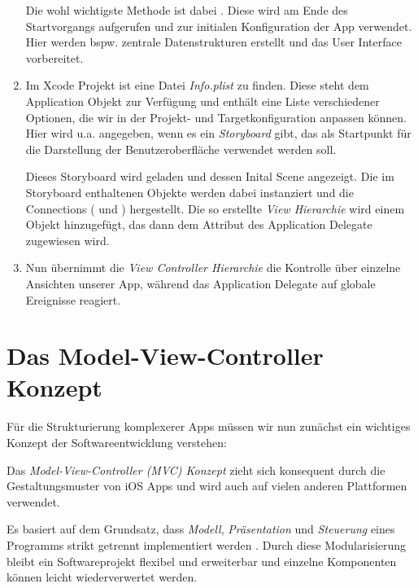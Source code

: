 \documentclass[parskip=half, final]{scrreprt}
\begin{document}
\begin{enumerate}
Die wohl wichtigste Methode ist dabei . Diese wird am Ende des Startvorgangs aufgerufen und zur initialen Konfiguration der App verwendet. Hier werden bspw. zentrale Datenstrukturen erstellt und das User Interface vorbereitet.

\item Im Xcode Projekt ist eine Datei \emph{Info.plist} zu finden. Diese steht dem Application Objekt zur Verfügung und enthält eine Liste verschiedener Optionen, die wir in der Projekt- und Targetkonfiguration anpassen können. Hier wird u.a. angegeben, wenn es ein \emph{Storyboard} gibt, das als Startpunkt für die Darstellung der Benutzeroberfläche verwendet werden soll.

Dieses Storyboard wird geladen und dessen Inital Scene angezeigt. Die im Storyboard enthaltenen Objekte werden dabei instanziert und die Connections ( und ) hergestellt. Die so erstellte \emph{View Hierarchie}  wird einem  Objekt hinzugefügt, das dann dem Attribut  des Application Delegate zugewiesen wird.

\item Nun übernimmt die \emph{View Controller Hierarchie}  die Kontrolle über einzelne Ansichten unserer App, während das Application Delegate auf globale Ereignisse reagiert.

\end{enumerate}

\clearpage


\section{Das Model-View-Controller Konzept}\label{sec:mvc}

Für die Strukturierung komplexerer Apps müssen wir nun zunächst ein wichtiges Konzept der Softwareentwicklung verstehen:

Das \emph{Model-View-Controller (MVC) Konzept} zieht sich konsequent durch die Gestaltungsmuster von iOS Apps und wird auch auf vielen anderen Plattformen verwendet.

Es basiert auf dem Grundsatz, dass \emph{Modell}, \emph{Präsentation} und \emph{Steuerung} eines Programms strikt getrennt implementiert werden . Durch diese Modularisierung bleibt ein Softwareprojekt flexibel und erweiterbar und einzelne Komponenten können leicht wiederverwertet werden.
\end{document}
